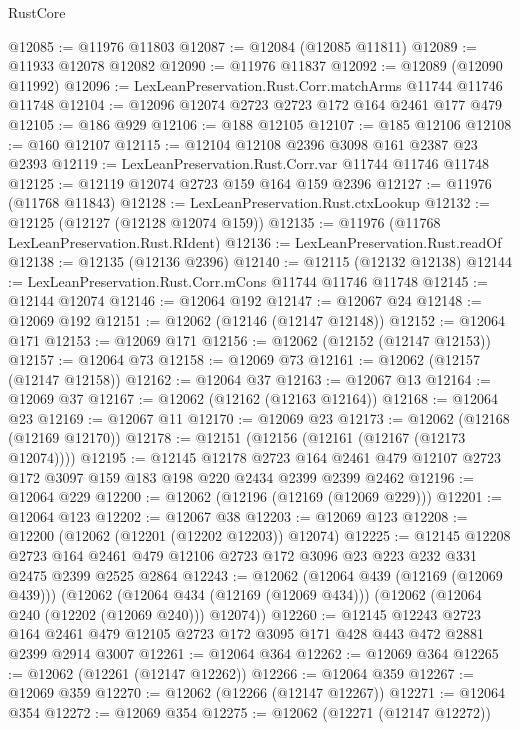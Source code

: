 \begin{lexlean}{RustCore}
\begin{coremodule}
@12085 := @11976 @11803
@12087 := @12084 (@12085 @11811)
@12089 := @11933 @12078 @12082
@12090 := @11976 @11837
@12092 := @12089 (@12090 @11992)
@12096 := LexLeanPreservation.Rust.Corr.matchArms @11744 @11746 @11748
@12104 := @12096 @12074 @2723 @2723 @172 @164 @2461 @177 @479
@12105 := @186 @929
@12106 := @188 @12105
@12107 := @185 @12106
@12108 := @160 @12107
@12115 := @12104 @12108 @2396 @3098 @161 @2387 @23 @2393
@12119 := LexLeanPreservation.Rust.Corr.var @11744 @11746 @11748
@12125 := @12119 @12074 @2723 @159 @164 @159 @2396
@12127 := @11976 (@11768 @11843)
@12128 := LexLeanPreservation.Rust.ctxLookup
@12132 := @12125 (@12127 (@12128 @12074 @159))
@12135 := @11976 (@11768 LexLeanPreservation.Rust.RIdent)
@12136 := LexLeanPreservation.Rust.readOf
@12138 := @12135 (@12136 @2396)
@12140 := @12115 (@12132 @12138)
@12144 := LexLeanPreservation.Rust.Corr.mCons @11744 @11746 @11748
@12145 := @12144 @12074
@12146 := @12064 @192
@12147 := @12067 @24
@12148 := @12069 @192
@12151 := @12062 (@12146 (@12147 @12148))
@12152 := @12064 @171
@12153 := @12069 @171
@12156 := @12062 (@12152 (@12147 @12153))
@12157 := @12064 @73
@12158 := @12069 @73
@12161 := @12062 (@12157 (@12147 @12158))
@12162 := @12064 @37
@12163 := @12067 @13
@12164 := @12069 @37
@12167 := @12062 (@12162 (@12163 @12164))
@12168 := @12064 @23
@12169 := @12067 @11
@12170 := @12069 @23
@12173 := @12062 (@12168 (@12169 @12170))
@12178 := @12151 (@12156 (@12161 (@12167 (@12173 @12074))))
@12195 := @12145
    @12178
    @2723
    @164
    @2461
    @479
    @12107
    @2723
    @172
    @3097
    @159
    @183
    @198
    @220
    @2434
    @2399
    @2399
    @2462
@12196 := @12064 @229
@12200 := @12062 (@12196 (@12169 (@12069 @229)))
@12201 := @12064 @123
@12202 := @12067 @38
@12203 := @12069 @123
@12208 := @12200 (@12062 (@12201 (@12202 @12203)) @12074)
@12225 := @12145
    @12208
    @2723
    @164
    @2461
    @479
    @12106
    @2723
    @172
    @3096
    @23
    @223
    @232
    @331
    @2475
    @2399
    @2525
    @2864
@12243 := @12062
    (@12064 @439 (@12169 (@12069 @439)))
    (@12062
      (@12064 @434 (@12169 (@12069 @434)))
      (@12062 (@12064 @240 (@12202 (@12069 @240))) @12074))
@12260 := @12145
    @12243
    @2723
    @164
    @2461
    @479
    @12105
    @2723
    @172
    @3095
    @171
    @428
    @443
    @472
    @2881
    @2399
    @2914
    @3007
@12261 := @12064 @364
@12262 := @12069 @364
@12265 := @12062 (@12261 (@12147 @12262))
@12266 := @12064 @359
@12267 := @12069 @359
@12270 := @12062 (@12266 (@12147 @12267))
@12271 := @12064 @354
@12272 := @12069 @354
@12275 := @12062 (@12271 (@12147 @12272))

\end{coremodule}
\end{lexlean}
